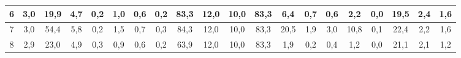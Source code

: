 \begin{sidewaystable}[]
\begin{tabular}{|c|c|c|c|c|c|c|c|c|c|c|c|c|c|c|c|c|c|c|c|}
    6  & 3,0                                              & 19,9                                             & 4,7                                              & 0,2                                              & 1,0                                              & 0,6                                              & 0,2                                              & 83,3                                            & 12,0                                            & 10,0                                            & 83,3                                            & 6,4                                             & 0,7                                             & 0,6                                             & 2,2                                             & 0,0                                             & 19,5                                             & 2,4                                              & 1,6                                              \\ \hline
    7  & 3,0                                              & 54,4                                             & 5,8                                              & 0,2                                              & 1,5                                              & 0,7                                              & 0,3                                              & 84,3                                            & 12,0                                            & 10,0                                            & 83,3                                            & 20,5                                            & 1,9                                             & 3,0                                             & 10,8                                            & 0,1                                             & 22,4                                             & 2,2                                              & 1,6                                              \\ \hline
    8  & 2,9                                              & 23,0                                             & 4,9                                              & 0,3                                              & 0,9                                              & 0,6                                              & 0,2                                              & 63,9                                            & 12,0                                            & 10,0                                            & 83,3                                            & 1,9                                             & 0,2                                             & 0,4                                             & 1,2                                             & 0,0                                             & 21,1                                             & 2,1                                              & 1,2                                              \\ \hline

\end{tabular}
\end{sidewaystable}
